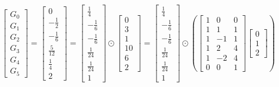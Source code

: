 \documentclass{article}%
\begin{document}
\[%
\left[\begin{matrix}G_{0}\\G_{1}\\G_{2}\\G_{3}\\G_{4}\\G_{5}\end{matrix}\right] = \left[\begin{matrix}0\\- \frac{1}{2}\\- \frac{1}{6}\\\frac{5}{12}\\\frac{1}{4}\\2\end{matrix}\right] = \left[\begin{matrix}\frac{1}{4}\\- \frac{1}{6}\\- \frac{1}{6}\\\frac{1}{24}\\\frac{1}{24}\\1\end{matrix}\right] \odot \left[\begin{matrix}0\\3\\1\\10\\6\\2\end{matrix}\right] = \left[\begin{matrix}\frac{1}{4}\\- \frac{1}{6}\\- \frac{1}{6}\\\frac{1}{24}\\\frac{1}{24}\\1\end{matrix}\right] \odot \left( \left[\begin{matrix}1 & 0 & 0\\1 & 1 & 1\\1 & -1 & 1\\1 & 2 & 4\\1 & -2 & 4\\0 & 0 & 1\end{matrix}\right] \left[\begin{matrix}0\\1\\2\end{matrix}\right] \right)%
\]%
\end{document}
